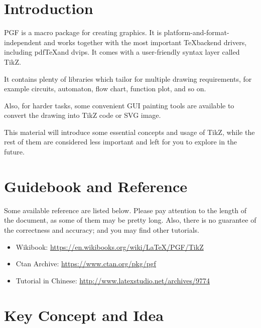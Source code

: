 \documentclass[english]{../TeXTemplate/pkupaper}
\title{\titlemark}
\author{Shlw}
\date{\today}
\begin{document}
\maketitle

\section{Introduction}

PGF is a macro package for creating graphics. It is platform-and-format-independent
and works together with the most important \TeX backend drivers,
including pdf\TeX and dvips.
It comes with a user-friendly syntax layer called TikZ.\par

It contains plenty of libraries which tailor for multiple drawing requirements,
for example circuits, automaton, flow chart, function plot, and so on.\par

Also, for harder tasks, some convenient GUI painting tools are available to
convert the drawing into TikZ code or SVG image.\par

This material will introduce some essential concepts and usage of TikZ, while
the rest of them are considered less important and left for you to explore
in the future.

\section{Guidebook and  Reference}
Some available reference are listed below. Please pay attention to the 
length of the document, as some of them may be pretty long. Also, there
is no guarantee of the correctness and accuracy; and you may find other
tutorials.
\begin{itemize}
\item Wikibook: \url{https://en.wikibooks.org/wiki/LaTeX/PGF/TikZ}
\item Ctan Archive: \url{https://www.ctan.org/pkg/pgf}
\item Tutorial in Chinese: \url{http://www.latexstudio.net/archives/9774}
\end{itemize}

\section{Key Concept and Idea}
\end{document}
